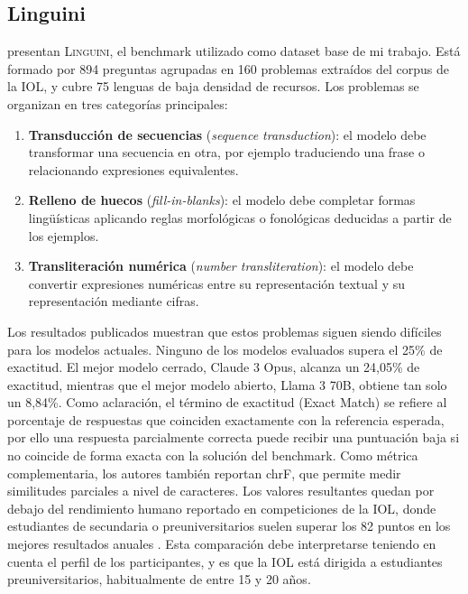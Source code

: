\subsection{Linguini}

\citet{sanchez2024linguini} presentan \textsc{Linguini}, el benchmark utilizado como dataset base de mi trabajo. Está formado por 894 preguntas agrupadas en 160 problemas extraídos del corpus de la IOL, y cubre 75 lenguas de baja densidad de recursos. Los problemas se organizan en tres categorías principales:

\begin{enumerate}
	\item \textbf{Transducción de secuencias} (\textit{sequence transduction}): el modelo debe transformar una secuencia en otra, por ejemplo traduciendo una frase o relacionando expresiones equivalentes.
	\item \textbf{Relleno de huecos} (\textit{fill-in-blanks}): el modelo debe completar formas lingüísticas aplicando reglas morfológicas o fonológicas deducidas a partir de los ejemplos.
	\item \textbf{Transliteración numérica} (\textit{number transliteration}): el modelo debe convertir expresiones numéricas entre su representación textual y su representación mediante cifras.
\end{enumerate}

Los resultados publicados muestran que estos problemas siguen siendo difíciles para los modelos actuales. Ninguno de los modelos evaluados supera el 25\% de exactitud. El mejor modelo cerrado, Claude 3 Opus, alcanza un 24,05\% de exactitud, mientras que el mejor modelo abierto, Llama 3 70B, obtiene tan solo un 8,84\%. Como aclaración, el término de exactitud (Exact Match) se refiere al porcentaje de respuestas que coinciden exactamente con la referencia esperada, por ello una respuesta parcialmente correcta puede recibir una puntuación baja si no coincide de forma exacta con la solución del benchmark. Como métrica complementaria, los autores también reportan chrF, que permite medir similitudes parciales a nivel de caracteres. Los valores resultantes quedan por debajo del rendimiento humano reportado en competiciones de la IOL, donde estudiantes de secundaria o preuniversitarios suelen superar los 82 puntos en los mejores resultados anuales \citep{sanchez2024linguini,iol2026problems}. Esta comparación debe interpretarse teniendo en cuenta el perfil de los participantes, y es que la IOL está dirigida a estudiantes preuniversitarios, habitualmente de entre 15 y 20 años.

